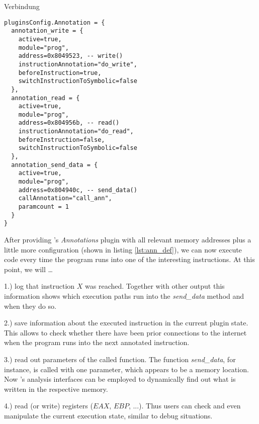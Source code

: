 Verbindung

\bigskip
\begin{lstlisting}[language={[5.0]Lua}, basicstyle=\ttfamily\footnotesize, caption={Configuration of the \textit{Annotations} plugin (part). Defines the instructions to be monitored and actions to trigger upon execution of these instructions. Note the link to the binary in listing \ref{lst:ass} via memory addresses.}, label={lst:ann_def}]
pluginsConfig.Annotation = {
  annotation_write = {
    active=true,
    module="prog",
    address=0x8049523, -- write()
    instructionAnnotation="do_write",
    beforeInstruction=true,
    switchInstructionToSymbolic=false
  },
  annotation_read = {
    active=true,
    module="prog",
    address=0x804956b, -- read()
    instructionAnnotation="do_read",
    beforeInstruction=false, 
    switchInstructionToSymbolic=false
  },
  annotation_send_data = {
    active=true,
    module="prog",
    address=0x804940c, -- send_data()
    callAnnotation="call_ann",
    paramcount = 1
  }
}
\end{lstlisting}
\bigskip


After providing \sse's \textit{Annotations} plugin with all relevant memory addresses plus a little more configuration (shown in listing \ref{lst:ann_def}), we can now execute code every time the program runs into one of the interesting instructions.
At this point, we will \ldots

1.) log that instruction $X$ was reached.
Together with other \sse output this information shows which execution paths run into the \textit{send\_data} method and when they do so.

2.) save information about the executed instruction in the current plugin state.
This allows to check whether there have been prior connections to the internet when the program runs into the next annotated instruction.

3.) read out parameters of the called function.
The function \textit{send\_data}, for instance, is called with one parameter, which appears to be a memory location.
Now \sse's analysis interfaces can be employed to dynamically find out what is written in the respective memory.

4.) read (or write) registers ($EAX$, $EBP$, ...).
Thus \sse users can check and even manipulate the current execution state, similar to debug situations.

